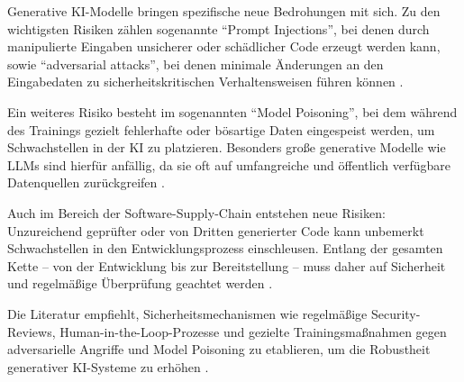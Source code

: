 
Generative KI-Modelle bringen spezifische neue Bedrohungen mit sich. Zu den
wichtigsten Risiken zählen sogenannte \enquote{Prompt Injections}, bei denen
durch manipulierte Eingaben unsicherer oder schädlicher Code erzeugt werden
kann, sowie \enquote{adversarial attacks}, bei denen minimale Änderungen an den
Eingabedaten zu sicherheitskritischen Verhaltensweisen führen können
\cite{shi_ai-assisted_2023}.

Ein weiteres Risiko besteht im sogenannten \enquote{Model Poisoning}, bei dem
während des Trainings gezielt fehlerhafte oder bösartige Daten eingespeist
werden, um Schwachstellen in der KI zu platzieren. Besonders große generative
Modelle wie LLMs sind hierfür anfällig, da sie oft auf umfangreiche und
öffentlich verfügbare Datenquellen zurückgreifen \cite{alwageed_role_nodate}.

Auch im Bereich der Software-Supply-Chain entstehen neue Risiken: Unzureichend
geprüfter oder von Dritten generierter Code kann unbemerkt Schwachstellen in
den Entwicklungsprozess einschleusen. Entlang der gesamten Kette – von der
Entwicklung bis zur Bereitstellung – muss daher auf Sicherheit und regelmäßige
Überprüfung geachtet werden \cite{siebert_generative_2024}.

Die Literatur empfiehlt, Sicherheitsmechanismen wie regelmäßige
Security-Reviews, Human-in-the-Loop-Prozesse und gezielte Trainingsmaßnahmen
gegen adversarielle Angriffe und Model Poisoning zu etablieren, um die
Robustheit generativer KI-Systeme zu erhöhen \cite{shi_ai-assisted_2023,
    alwageed_role_nodate, siebert_generative_2024}.
